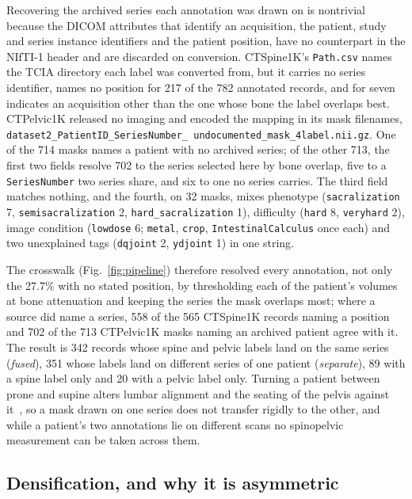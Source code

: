 \documentclass[aapm,mph,amsmath,amssymb,reprint]{revtex4-2}
\begin{document}
Recovering the archived series each annotation was drawn on is nontrivial because the DICOM
attributes that identify an acquisition, the patient, study and series instance identifiers
and the patient position,\cite{dicomps3} have no counterpart in the NIfTI-1
header\cite{nifti1} and are discarded on conversion.\cite{li2016} CTSpine1K's
\texttt{Path.csv} names the TCIA directory each label was converted from, but it carries no
series identifier, names no position for 217 of the 782 annotated records, and for seven
indicates an acquisition other than the one whose bone the label overlaps best.
CTPelvic1K released no imaging and encoded the mapping in its mask filenames,
\texttt{dataset2\_\allowbreak PatientID\_\allowbreak SeriesNumber\_\allowbreak
undocumented\_\allowbreak [tag\_]\allowbreak mask\_4label.nii.gz}. One of the 714 masks names a
patient with no archived series; of the other 713, the first two fields resolve 702 to the
series selected here by bone overlap, five to a \texttt{SeriesNumber} two series share, and six
to one no series carries. The third field matches nothing, and the fourth, on 32 masks, mixes
phenotype (\texttt{sacralization} 7, \texttt{semisacralization} 2,
\texttt{hard\_sacralization} 1), difficulty (\texttt{hard} 8, \texttt{veryhard} 2), image
condition (\texttt{lowdose} 6; \texttt{metal}, \texttt{crop}, \texttt{IntestinalCalculus} once
each) and two unexplained tags (\texttt{dqjoint} 2, \texttt{ydjoint} 1) in one string.

The crosswalk (Fig.~\ref{fig:pipeline}) therefore resolved every annotation, not only the
27.7\% with no stated position, by thresholding each of the patient's volumes at bone
attenuation and keeping the series the mask overlaps most; where a source did name a series,
558 of the 565 CTSpine1K records naming a position and 702 of the 713 CTPelvic1K masks naming
an archived patient agree with it. The result is 342 records whose spine and pelvic labels
land on the same series (\emph{fused}), 351 whose labels land on different series of one
patient (\emph{separate}), 89 with a spine label only and 20 with a pelvic label only. Turning
a patient between prone and supine alters lumbar alignment and the seating of the pelvis
against it~\cite{hasegawa2018}, so a mask drawn on one series does not transfer rigidly to the
other, and while a patient's two annotations lie on different scans no spinopelvic measurement
can be taken across them.

\subsection{Densification, and why it is asymmetric}
\end{document}
